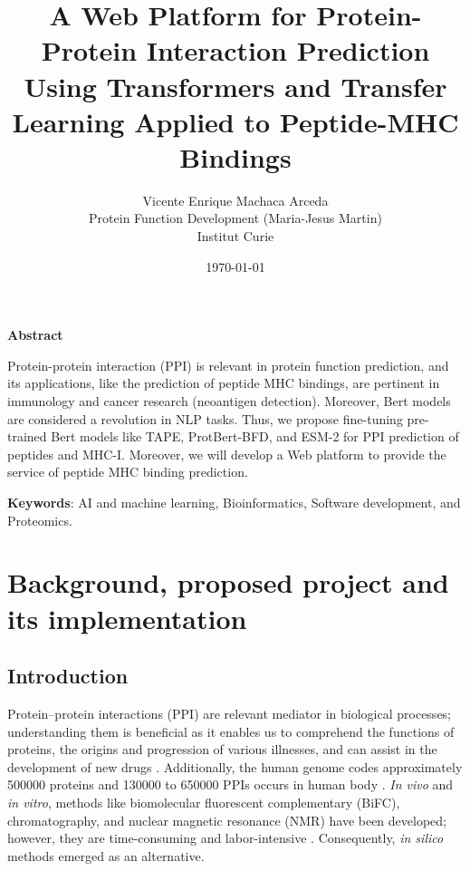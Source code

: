 \documentclass[a4paper,11pt]{article}
\title{ A Web Platform for Protein-Protein Interaction Prediction Using Transformers and Transfer Learning Applied to Peptide-MHC Bindings }
\author{Vicente Enrique Machaca Arceda \\ Protein Function Development (Maria-Jesus Martin) \\ Institut Curie}
\date{\today}
\begin{document}
	
\maketitle
	
\begin{center}
	\begin{large}
		\textbf{Abstract}
	\end{large} 
\end{center}

	\vspace{0.1cm}
	
	Protein-protein interaction (PPI) is relevant in protein function prediction, and its applications, like the prediction of peptide MHC bindings, are pertinent in immunology and cancer research (neoantigen detection). Moreover, Bert models are considered a revolution in NLP tasks. Thus, we propose fine-tuning pre-trained Bert models like  TAPE, ProtBert-BFD, and ESM-2 for PPI prediction of peptides and MHC-I. Moreover, we will develop a Web platform to provide the service of peptide MHC binding prediction.
	


	
\textbf{Keywords}: 	AI and machine learning, Bioinformatics, Software development, and Proteomics.
	


\section{Background, proposed project and its implementation}

\subsection{Introduction}

Protein–protein interactions (PPI) are relevant mediator in biological processes; understanding  them is beneficial as it enables us to comprehend the functions of proteins, the origins and progression of various illnesses, and can assist in the development of new drugs  \cite{hu2022deep,jha2023prediction}. Additionally, the human genome codes approximately 500000 proteins and 130000 to 650000 PPIs occurs in human body \cite{hu2022deep}. \textit{In vivo} and \textit{in vitro}, methods like biomolecular fluorescent complementary (BiFC), chromatography, and nuclear magnetic resonance (NMR) have been developed; however, they are time-consuming and labor-intensive \cite{rao2014protein,hu2022deep}. Consequently, \textit{in silico} methods  emerged as an alternative.\\
\end{document}
